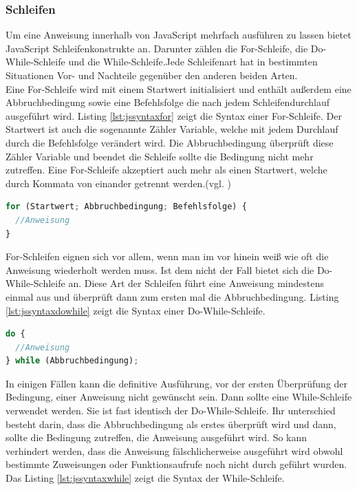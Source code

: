 \subsubsection{Schleifen} Um eine Anweisung innerhalb von JavaScript mehrfach ausführen zu lassen bietet JavaScript Schleifenkonstrukte an. Darunter zählen die For-Schleife, die Do-While-Schleife und die While-Schleife.Jede Schleifenart hat in bestimmten Situationen Vor- und Nachteile gegenüber den anderen beiden Arten.\\Eine For-Schleife wird mit einem Startwert initialisiert und enthält außerdem eine Abbruchbedingung sowie eine Befehlsfolge die nach jedem Schleifendurchlauf ausgeführt wird. Listing \ref{lst:jssyntaxfor} zeigt die Syntax einer For-Schleife. Der Startwert ist auch die sogenannte Zähler Variable, welche mit jedem Durchlauf durch die Befehlsfolge verändert wird. Die Abbruchbedingung überprüft diese Zähler Variable und beendet die Schleife sollte die Bedingung nicht mehr zutreffen. Eine For-Schleife akzeptiert auch mehr als einen Startwert, welche durch Kommata von einander getrennt werden.(vgl. \cite[S.75f]{WenzJava2008})

\vspace{1em}
\begin{lstlisting}[language=JavaScript, caption=Syntax For-Schleife, label=lst:jssyntaxfor]
for (Startwert; Abbruchbedingung; Befehlsfolge) {
  //Anweisung
}
\end{lstlisting}
	
For-Schleifen eignen sich vor allem, wenn man im vor hinein weiß wie oft die Anweisung wiederholt werden muss. Ist dem nicht der Fall bietet sich die Do-While-Schleife an. Diese Art der Schleifen führt eine Anweisung mindestens einmal aus und überprüft dann zum ersten mal die Abbruchbedingung. Listing \ref{lst:jssyntaxdowhile} zeigt die Syntax einer Do-While-Schleife.

\vspace{1em}
\begin{lstlisting}[language=JavaScript, caption=Syntax Do-While-Schleife, label=lst:jssyntaxdowhile]
do {
  //Anweisung
} while (Abbruchbedingung);
\end{lstlisting}

In einigen Fällen kann die definitive Ausführung, vor der ersten Überprüfung der Bedingung, einer Anweisung nicht gewünscht sein. Dann sollte eine While-Schleife verwendet werden. Sie ist fast identisch der Do-While-Schleife. Ihr unterschied besteht darin, dass die Abbruchbedingung als erstes überprüft wird und dann, sollte die Bedingung zutreffen, die Anweisung ausgeführt wird. So kann verhindert werden, dass die Anweisung fälschlicherweise ausgeführt wird obwohl bestimmte Zuweisungen oder Funktionsaufrufe noch nicht durch geführt wurden. Das Listing \ref{lst:jssyntaxwhile} zeigt die Syntax der While-Schleife.


